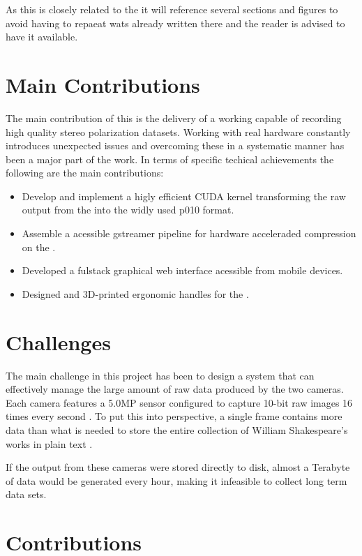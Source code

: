 As this \master is closely related to the \preproject it will reference several sections and figures to avoid having to repaeat wats already written there and the reader is advised to have it available.

\section{Main Contributions}
The main contribution of this \master is the delivery of a working \sr capable of recording high quality stereo polarization datasets.
Working with real hardware constantly introduces unexpected issues and overcoming these in a systematic manner has been a major part of the work.
In terms of specific techical achievements the following are the main contributions:

\begin{itemize}
    \item Develop and implement a higly efficient CUDA kernel transforming the raw output from the \cams into the widly used \gls{p010} format.
    \item Assemble a \py acessible \gls{gstreamer} pipeline for hardware acceleraded compression on the \jx.
    \item Developed a fulstack graphical web interface acessible from mobile devices.
    \item Designed and 3D-printed ergonomic handles for the \sr.
\end{itemize}

\section{Challenges}
The main challenge in this project has been to design a system that can effectively manage the large amount of raw data produced by the two cameras.
Each camera features a 5.0MP sensor configured to capture 10-bit raw images 16 times every second \cite{lucidvisionlabsTriton0MPPolarization}.
To put this into perspective, a single frame contains more data than what is needed to store the entire collection of William Shakespeare's works in plain text \cite{projectgutenbergCompleteWorksWilliam1994}.

If the output from these cameras were stored directly to disk, almost a Terabyte of data would be generated every hour, making it infeasible to collect long term data sets.
\section{Contributions}



